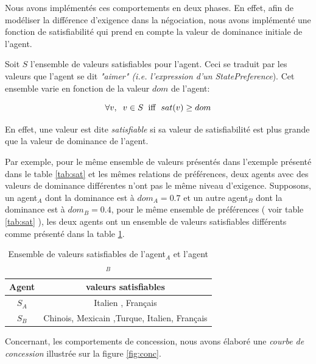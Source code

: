 	Nous avons implémentés ces comportements en deux phases. En effet, afin de modéliser la différence d'exigence dans la négociation, nous avons implémenté une fonction de satisfiabilité qui prend en compte la valeur de dominance initiale de l'agent. 
	
	Soit $S$ l'ensemble de valeurs satisfiables pour l'agent. Ceci se traduit par les valeurs que l'agent se dit \textit{"aimer" (i.e. l'expression d'un } \emph{StatePreference}). Cet ensemble varie en fonction de la valeur $dom$ de l'agent:
	
	\begin{equation}
	\forall v,\hspace{2mm} v\in S\hspace{2mm}\mathrm{iff}\hspace{2mm}sat(v) \geq dom
	\end{equation}
	
	En effet, une valeur est dite \textit{satisfiable} si sa valeur de satisfiabilité est plus grande que la valeur de dominance de l'agent.
	
	Par exemple, pour le même ensemble de valeurs présentés dans l'exemple présenté dans le table \ref{tab:sat} et les mêmes relations de préférences, deux agents avec des valeurs de dominance différentes n'ont pas le même niveau d'exigence. Supposons, un agent$_A$ dont la dominance est à $dom_A=0.7$ et un autre agent$_B$ dont la dominance est à $dom_B=0.4$, pour le même ensemble de préférences ( voir table \ref{tab:sat} ), les deux agents ont un ensemble de valeurs satisfiables différents comme présenté dans la table \ref{tab:exSat}.
	
	\begin{table}[h]
		\centering
		{\scriptsize
			\begin{tabular}{ |c|c| }
				\hline
				\textbf{Agent} & \textbf{valeurs satisfiables} \\
				\hline				
				$S_A$ & Italien , Français \\
				\hline
				
				$S_B$ & Chinois,  Mexicain ,Turque, Italien, Français\\
				\hline
				
			\end{tabular}}
			\caption{Ensemble de valeurs satisfiables de l'agent$_A$ et l'agent $_B$}
			\label{tab:exSat}
		\end{table}

	
	Concernant, les comportements de concession, nous avons élaboré une \emph {courbe de concession} illustrée sur la figure \ref{fig:conc}. 
	

